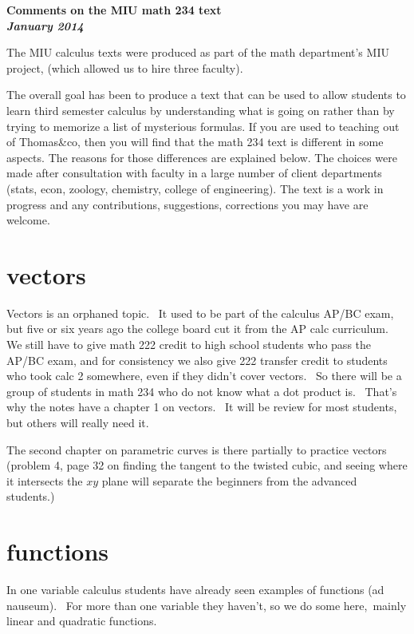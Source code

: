 \documentclass[11pt]{amsbook}
\begin{document}
\begin{center}
  \bfseries\color{badgerred}
  Comments on the MIU math 234 text
  \\
  \mdseries\itshape
  January 2014
\end{center}
The MIU calculus texts were produced as part of the math department's MIU project,
(which allowed us to hire three faculty).

The overall goal has been to produce a text that can be used to allow students to
learn third semester calculus by understanding what is going on rather than by trying
to memorize a list of mysterious formulas.  If you are used to teaching out of
Thomas\&co, then you will find that the math 234 text is different in some aspects.
The reasons for those differences are explained below.   The choices were made after
consultation with faculty in a large number of client departments (stats, econ,
zoology, chemistry, college of engineering).  
The text is a work in
progress and any contributions, suggestions, corrections you may have are welcome.

\section*{vectors}
Vectors is an orphaned topic.  It used to be part of the calculus AP/BC exam,
but five or six years ago the college board cut it from the AP calc curriculum. 
We still have to give math 222 credit to high school students who pass the AP/BC
exam, and for consistency we also give 222 transfer credit to students who took
calc 2 somewhere, even if they didn't cover vectors.  So there will be a group
of students in math 234 who do not know what a dot product is.  That's why the
notes have a chapter 1 on vectors.  It will be review for most students, but
others will really need it.  

The second chapter on parametric curves is there partially to practice vectors
(problem 4, page 32 on finding the tangent to the twisted cubic, and seeing
where it intersects the $xy$ plane will separate the beginners from the advanced
students.) 

\section*{functions}
In one variable calculus students have already seen examples of functions (ad
nauseum).  For more than one variable they haven't, so we do some here, mainly
linear and quadratic functions.
\end{document}
